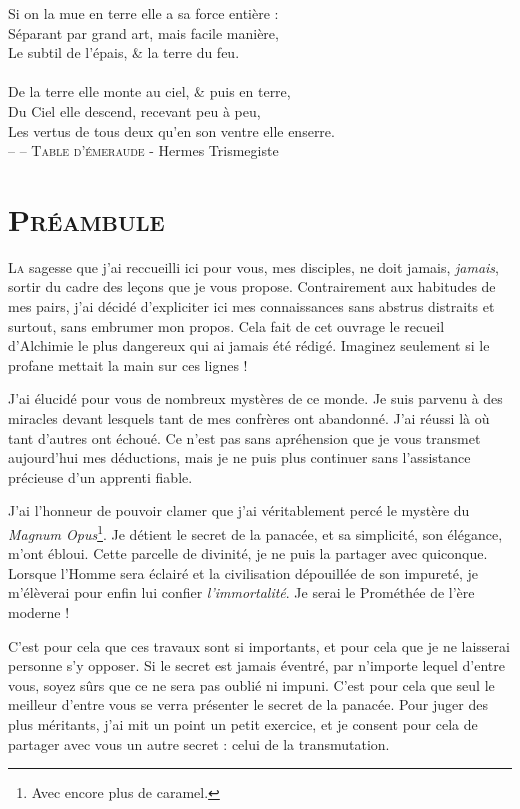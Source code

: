 \noindent
Si on la mue en terre elle a sa force entière :\\
Séparant par grand art, mais facile manière,\\
Le subtil de l'épais, \& la terre du feu.\\
\\
De la terre elle monte au ciel, \& puis en terre,\\
Du Ciel elle descend, recevant peu à peu,\\
Les vertus de tous deux qu'en son ventre elle enserre.\\

\small{-- -- \textsc{Table d'émeraude} - Hermes Trismegiste}

\newpage

\section{\textsc{Préambule}}

\lettrine{L}{a} sagesse que j'ai reccueilli ici pour vous, mes disciples, ne doit jamais,
\emph{jamais}, sortir du cadre des leçons que je vous propose.
Contrairement aux habitudes de mes pairs, j'ai décidé d'expliciter ici mes
connaissances sans abstrus distraits et surtout, sans embrumer mon
propos. Cela fait de cet ouvrage le recueil d'Alchimie le plus dangereux qui
ai jamais été rédigé. Imaginez seulement si le profane mettait la main sur ces
lignes !

J'ai élucidé pour vous de nombreux mystères de ce monde. Je suis parvenu à des
miracles devant lesquels tant de mes confrères ont abandonné. J'ai réussi là où
tant d'autres ont échoué. Ce n'est pas
sans apréhension que je vous transmet aujourd'hui mes déductions, mais je ne puis
plus continuer sans l'assistance précieuse d'un apprenti fiable.

J'ai l'honneur de pouvoir clamer que j'ai véritablement percé le mystère du
\emph{Magnum Opus}\footnote{Avec encore plus de caramel.}. Je détient le secret de la panacée, et sa simplicité, son
élégance, m'ont ébloui. Cette parcelle de divinité, je ne puis la partager avec
quiconque. Lorsque l'Homme sera éclairé et la civilisation dépouillée de son
impureté, je m'élèverai pour enfin lui confier \emph{l'immortalité}. Je serai
le Prométhée de l'ère moderne !

C'est pour cela que ces travaux sont si importants, et pour cela que je ne
laisserai personne s'y opposer. Si le secret est jamais éventré, par n'importe
lequel d'entre vous, soyez sûrs que ce ne sera pas oublié ni impuni.
C'est pour cela que seul le meilleur d'entre vous se verra présenter le secret
de la panacée. Pour juger des plus méritants, j'ai mit un point un petit
exercice, et je consent pour cela de partager avec vous un autre secret : celui
de la transmutation.

